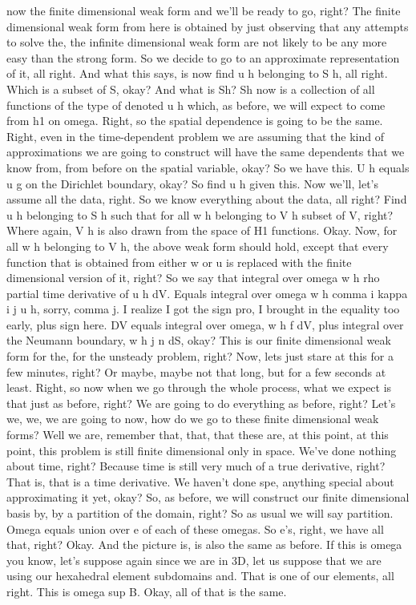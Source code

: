 \documentclass[10pt]{article}
\begin{document}
now the finite dimensional weak form and we'll be ready to go, right? The finite dimensional weak form from here is obtained by just observing that any attempts to solve the, the infinite dimensional weak form are not likely to be any more easy than the strong form. So we decide to go to an approximate representation of it, all right. And what this says, is now find u h belonging to S h, all right. Which is a subset of S, okay? And what is Sh? Sh now is a collection of all functions of the type of denoted u h which, as before, we will expect to come from h1 on omega. Right, so the spatial dependence is going to be the same. Right, even in the time-dependent problem we are assuming that the kind of approximations we are going to construct will have the same dependents that we know from, from before on the spatial variable, okay? So we have this. U h equals u g on the Dirichlet boundary, okay? So find u h given this. Now we'll, let's assume all the data, right. So we know everything about the data, all right? Find u h belonging to S h such that for all w h belonging to V h subset of V, right? Where again, V h is also drawn from the space of H1 functions. Okay. Now, for all w h belonging to V h, the above weak form should hold, except that every function that is obtained from either w or u is replaced with the finite dimensional version of it, right? So we say that integral over omega w h rho partial time derivative of u h dV. Equals integral over omega w h comma i kappa i j u h, sorry, comma j. I realize I got the sign pro, I brought in the equality too early, plus sign here. DV equals integral over omega, w h f dV, plus integral over the Neumann boundary, w h j n dS, okay? This is our finite dimensional weak form for the, for the unsteady problem, right? Now, lets just stare at this for a few minutes, right? Or maybe, maybe not that long, but for a few seconds at least. Right, so now when we go through the whole process, what we expect is that just as before, right? We are going to do everything as before, right? Let's we, we, we are going to now, how do we go to these finite dimensional weak forms? Well we are, remember that, that, that these are, at this point, at this point, this problem is still finite dimensional only in space. We've done nothing about time, right? Because time is still very much of a true derivative, right? That is, that is a time derivative. We haven't done spe, anything special about approximating it yet, okay? So, as before, we will construct our finite dimensional basis by, by a partition of the domain, right? So as usual we will say partition. Omega equals union over e of each of these omegas. So e's, right, we have all that, right? Okay. And the picture is, is also the same as before. If this is omega you know, let's suppose again since we are in 3D, let us suppose that we are using our hexahedral element subdomains and. That is one of our elements, all right. This is omega sup B. Okay, all of that is the same.
\end{document}

